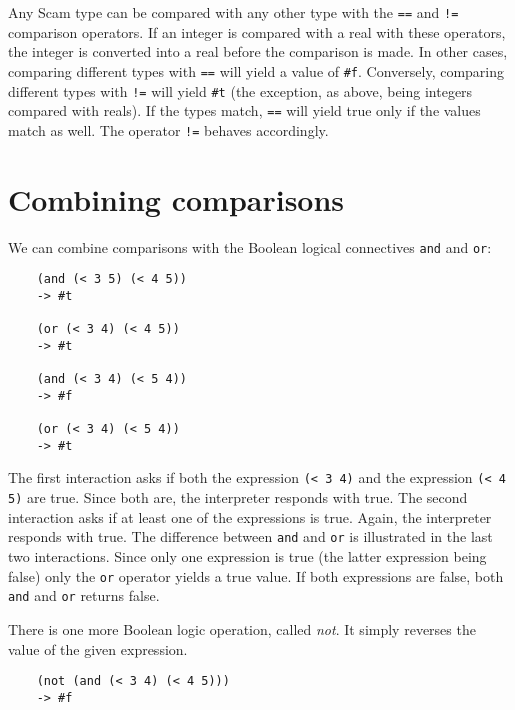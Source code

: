 Any Scam type can be compared with any other type with the
{\tt ==}
and
{\tt !=}
comparison operators.
If an integer is compared with a real with these
operators, the integer is converted into a real before the comparison
is made. In other cases, comparing different types with
{\tt ==}
will yield
a value of {\tt \#f}. Conversely, comparing different types with
{\tt !=}
will yield
{\tt \#t}
(the exception, as above, being integers compared with reals).
If the types match,
{\tt ==}
will yield true only if the values
match as well. The operator
{\tt !=}
behaves accordingly.

\section{Combining comparisons}

We can combine comparisons with the {\sc Boolean} logical connectives
{\tt and} and {\tt or}:

\begin{verbatim}
    (and (< 3 5) (< 4 5))
    -> #t
    
    (or (< 3 4) (< 4 5))
    -> #t
    
    (and (< 3 4) (< 5 4))
    -> #f
    
    (or (< 3 4) (< 5 4))
    -> #t
\end{verbatim}

The first interaction asks if both the expression
{\tt (< 3 4)} and the expression
{\tt (< 4 5)} are true. Since both are, the
interpreter responds with true. The second interaction
asks if at least one of the expressions is true. Again, the
interpreter responds with true. The difference between {\tt and}
and {\tt or} is illustrated in the last two interactions. Since
only one expression is true (the latter expression being
false) only the {\tt or} operator yields a true value.
If both expressions are false, both \verb!and! and \verb!or! returns false.

There is one more {\sc Boolean} logic operation, called
{\it not}. It simply reverses the value of the given expression.

\begin{verbatim}
    (not (and (< 3 4) (< 4 5)))
    -> #f
\end{verbatim}
